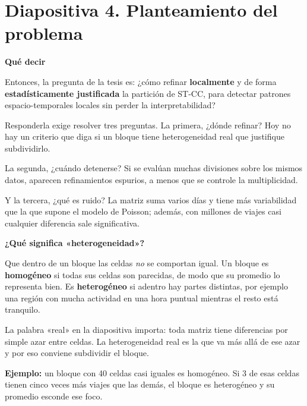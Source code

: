 \documentclass[11pt,a4paper]{article}
\newcommand{\cajainicio}[3]{\par\medskip\noindent
  \begin{lrbox}{\cajabox}\begin{minipage}{\dimexpr\linewidth-2\fboxsep-2\fboxrule\relax}%
  \textbf{\color{#1}#3}\par\smallskip}
\newcommand{\cajafin}[2]{\end{minipage}\end{lrbox}\fcolorbox{#1}{#2}{\usebox{\cajabox}}\par\medskip}
\newenvironment{guion}{\cajainicio{ucspblue}{ucspblue!6}{Qué decir}}{\cajafin{ucspblue}{ucspblue!6}}
\newenvironment{nota}[1]{\cajainicio{acc}{acc!7}{#1}}{\cajafin{acc}{acc!7}}
\newcommand{\STCC}{ST-CC}
\begin{document}
\newpage
\section*{Diapositiva 4. Planteamiento del problema}

\begin{guion}
Entonces, la pregunta de la tesis es: ¿cómo refinar \textbf{localmente} y de forma \textbf{estadísticamente justificada} la partición de \STCC, para detectar patrones espacio-temporales locales sin perder la interpretabilidad?

Responderla exige resolver tres preguntas. La primera, ¿dónde refinar? Hoy no hay un criterio que diga si un bloque tiene heterogeneidad real que justifique subdividirlo.

La segunda, ¿cuándo detenerse? Si se evalúan muchas divisiones sobre los mismos datos, aparecen refinamientos espurios, a menos que se controle la multiplicidad.

Y la tercera, ¿qué es ruido? La matriz suma varios días y tiene más variabilidad que la que supone el modelo de Poisson; además, con millones de viajes casi cualquier diferencia sale significativa.
\end{guion}

\begin{nota}{¿Qué significa «heterogeneidad»?}
Que dentro de un bloque las celdas \emph{no} se comportan igual. Un bloque es \textbf{homogéneo} si todas sus celdas son parecidas, de modo que su promedio lo representa bien. Es \textbf{heterogéneo} si adentro hay partes distintas, por ejemplo una región con mucha actividad en una hora puntual mientras el resto está tranquilo.

La palabra «real» en la diapositiva importa: toda matriz tiene diferencias por simple azar entre celdas. La heterogeneidad real es la que va más allá de ese azar y por eso conviene subdividir el bloque.

\textbf{Ejemplo:} un bloque con 40 celdas casi iguales es homogéneo. Si 3 de esas celdas tienen cinco veces más viajes que las demás, el bloque es heterogéneo y su promedio esconde ese foco.
\end{nota}
\end{document}
